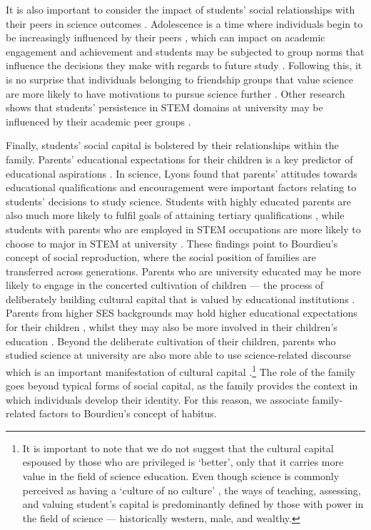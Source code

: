 \documentclass[smallextended]{svjour3}       %
\begin{document}
It is also important to consider the impact of students' social relationships with their peers in science outcomes \cite{osborne2003attitudes}. Adolescence is a time where individuals begin to be increasingly influenced by their peers \cite{douvan1966adolescent}, which can impact on academic engagement and achievement \cite{ryan2000peer} and students may be subjected to group norms that influence the decisions they make with regards to future study \cite{brown1986perceptions}. Following this, it is no surprise that individuals belonging to friendship groups that value science are more likely to have motivations to pursue science further \cite{robnett2013friendship}. Other research shows that students' persistence in STEM domains at university may be influenced by their academic peer groups \cite{Ost_2010}.

Finally, students' social capital is bolstered by their relationships within the family. Parents' educational expectations for their children is a key predictor of educational aspirations \cite{wu2015early}. In science, Lyons \citeyear{Lyons_2006} found that parents' attitudes towards educational qualifications and encouragement were important factors relating to students' decisions to study science. Students with highly educated parents are also much more likely to fulfil goals of attaining tertiary qualifications \cite{reynolds2011change}, while students with parents who are employed in STEM occupations are more likely to choose to major in STEM at university \cite{moakler2014college}. These findings point to Bourdieu's concept of social reproduction, where the social position of families are transferred across generations. Parents who are university educated may be more likely to engage in the concerted cultivation of children --- the process of deliberately building cultural capital that is valued by educational institutions \cite{lareau2011unequal}. Parents from higher SES backgrounds may hold higher educational expectations for their children \cite{carolan2015does}, whilst they may also be more involved in their children's education \cite{cheadle2011quantitative}.  Beyond the deliberate cultivation of their children, parents who studied science at university are also more able to use science-related discourse which is an important manifestation of cultural capital \cite{Lyons_2006,bernstein1971class}.\footnote{It is important to note that we do not suggest that the cultural capital espoused by those who are privileged is `better', only that it carries more value in the field of science education. Even though science is commonly perceived as having a `culture of no culture' \cite{traweek2009beamtimes}, the ways of teaching, assessing, and valuing student's capital is predominantly defined by those with power in the field of science --- historically western, male, and wealthy.}  The role of the family goes beyond typical forms of social capital, as the family provides the context in which individuals develop their identity. For this reason, we associate family-related factors to Bourdieu's concept of habitus.  
\end{document}
